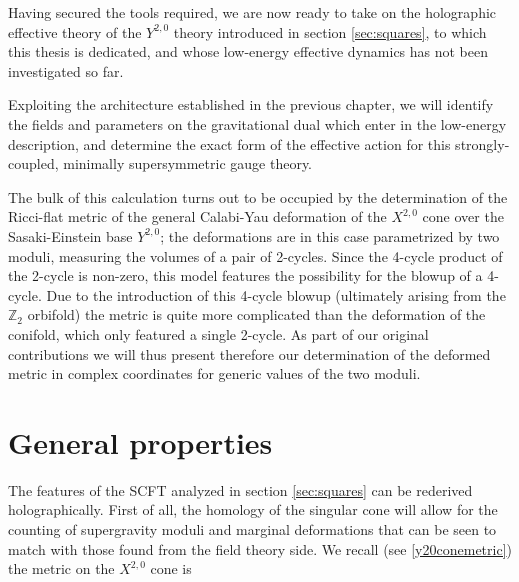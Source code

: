 %
%
%
\graphicspath{{images/}}
%

\label{chap:y20}

%

Having secured the tools required, we are now ready to take on the holographic effective theory of the $Y^{2,0}$ theory introduced in section \ref{sec:squares}, to which this thesis is dedicated, and whose low-energy effective dynamics has not been investigated so far.

Exploiting the architecture established in the previous chapter, we will identify the fields and parameters on the gravitational dual which enter in the low-energy description, and determine the exact form of the effective action for this strongly-coupled, minimally supersymmetric gauge theory. 

The bulk of this calculation turns out to be occupied by the determination of the Ricci-flat metric of the general Calabi-Yau deformation of the $X^{2,0}$ cone over the Sasaki-Einstein base $Y^{2,0}$; the deformations are in this case parametrized by two moduli, measuring the volumes of a pair of 2-cycles. Since the 4-cycle product of the 2-cycle is non-zero, this model features the possibility for the blowup of a 4-cycle. Due to the introduction of this 4-cycle blowup (ultimately arising from the $\mathbb{Z}_2$ orbifold) the metric is quite more complicated than the deformation of the conifold, which only featured a single 2-cycle. As part of our original contributions we will thus present therefore our determination of the deformed metric in complex coordinates for generic values of the two moduli.

\section{General properties}

The features of the SCFT analyzed in section \ref{sec:squares} can be rederived holographically. First of all, the homology of the singular cone will allow for the counting of supergravity moduli and marginal deformations that can be seen to match with those found from the field theory side. We recall (see \eqref{y20conemetric}) the metric on the $X^{2,0}$ cone is

